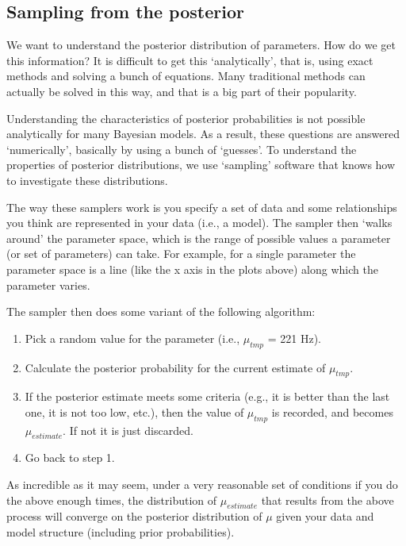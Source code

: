 \documentclass[
]{book}
\begin{document}
\hypertarget{sampling-from-the-posterior}{%
\subsection{Sampling from the posterior}\label{sampling-from-the-posterior}}

We want to understand the posterior distribution of parameters. How do we get this information? It is difficult to get this `analytically', that is, using exact methods and solving a bunch of equations. Many traditional methods can actually be solved in this way, and that is a big part of their popularity.

Understanding the characteristics of posterior probabilities is not possible analytically for many Bayesian models. As a result, these questions are answered `numerically', basically by using a bunch of `guesses'. To understand the properties of posterior distributions, we use `sampling' software that knows how to investigate these distributions.

The way these samplers work is you specify a set of data and some relationships you think are represented in your data (i.e., a model). The sampler then `walks around' the parameter space, which is the range of possible values a parameter (or set of parameters) can take. For example, for a single parameter the parameter space is a line (like the x axis in the plots above) along which the parameter varies.

The sampler then does some variant of the following algorithm:

\begin{enumerate}
\def\labelenumi{\arabic{enumi})}
\item
  Pick a random value for the parameter (i.e., \(\mu_{tmp}\) = 221 Hz).
\item
  Calculate the posterior probability for the current estimate of \(\mu_{tmp}\).
\item
  If the posterior estimate meets some criteria (e.g., it is better than the last one, it is not too low, etc.), then the value of \(\mu_{tmp}\) is recorded, and becomes \(\mu_{estimate}\). If not it is just discarded.
\item
  Go back to step 1.
\end{enumerate}

As incredible as it may seem, under a very reasonable set of conditions if you do the above enough times, the distribution of \(\mu_{estimate}\) that results from the above process will converge on the posterior distribution of \(\mu\) given your data and model structure (including prior probabilities).
\end{document}
